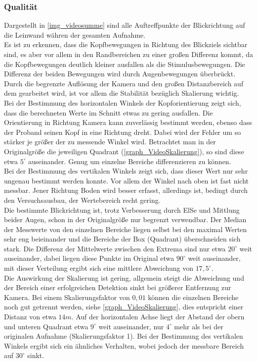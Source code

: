 \subsubsection{Qualität}
Dargestellt in \autoref{img_videosumme} sind alle Auftreffpunkte der Blickrichtung auf die Leinwand währen der gesamten Aufnahme.\\
Es ist zu erkennen, dass die Kopfbewegungen in Richtung des Blickziels sichtbar sind, es aber vor allem in den Randbereichen zu einer großen Differenz kommt, da die Kopfbewegungen deutlich kleiner ausfallen als die Stimulusbewegungen. Die Differenz der beiden Bewegungen wird durch Augenbewegungen überbrückt.\\
Durch die begrenzte Auflösung der Kamera und den großen Distanzbereich auf dem gearbeitet wird, ist vor allem die Stabilität bezüglich Skalierung wichtig.\\
Bei der Bestimmung des horizontalen Winkels der Kopforientierung zeigt sich, dass die berechneten Werte im Schnitt etwas zu gering ausfallen. Die Orientierung in Richtung Kamera kann zuverlässig bestimmt werden, ebenso dass der Proband seinen Kopf in eine Richtung dreht. Dabei wird der Fehler um so stärker je größer der zu messende Winkel wird. Betrachtet man in der Originalgröße die jeweiligen Quadrant (\autoref{graph_VideoSkalierung}), so sind diese etwa $5^\circ$ auseinander. Genug um einzelne Bereiche differenzieren zu können.\\
Bei der Bestimmung des vertikalen Winkels zeigt sich, dass dieser Wert nur sehr ungenau bestimmt werden konnte. Vor allem der Winkel nach oben ist fast nicht messbar. Jener Richtung Boden wird besser erfasst, allerdings ist, bedingt durch den Versuchsausbau, der Wertebereich recht gering.\\
Die bestimmte Blickrichtung ist, trotz Verbesserung durch ElSe und Mittlung beider Augen, schon in der Originalgröße nur begrenzt verwendbar. Der Median der Messwerte von den einzelnen Bereiche liegen selbst bei den maximal Werten sehr eng beieinander und die Bereiche der Box (Quadrant) überschneiden sich stark. Die Differenz der Mittelwerte zwischen den Extrema sind nur etwa $20^\circ$ weit auseinander, dabei liegen diese Punkte im Original etwa $90^\circ$ weit auseinander, mit dieser Verteilung ergibt sich eine mittlere Abweichung von $17,5^\circ$. \\
Die Auswirkung der Skalierung ist gering, allgemein steigt die Abweichung und der Bereich einer erfolgreichen Detektion sinkt bei größerer Entfernung zur Kamera. Bei einem Skalierungsfaktor von $0,01$ können die einzelnen Bereiche noch gut getrennt werden, siehe \autoref{graph_VideoSkalierung}, dies entspricht einer Distanz von etwa $14m$. Auf der horizontalen Achse liegt der Abstand der obern und unteren Quadrant etwa $9^\circ$ weit auseinander, nur $4^\circ$ mehr als bei der originalen Aufnahme (Skalierungsfaktor 1). Bei der Bestimmung des vertikalen Winkels ergibt sich ein ähnliches Verhalten, wobei jedoch der messbare Bereich auf $30^\circ$ sinkt.\\
